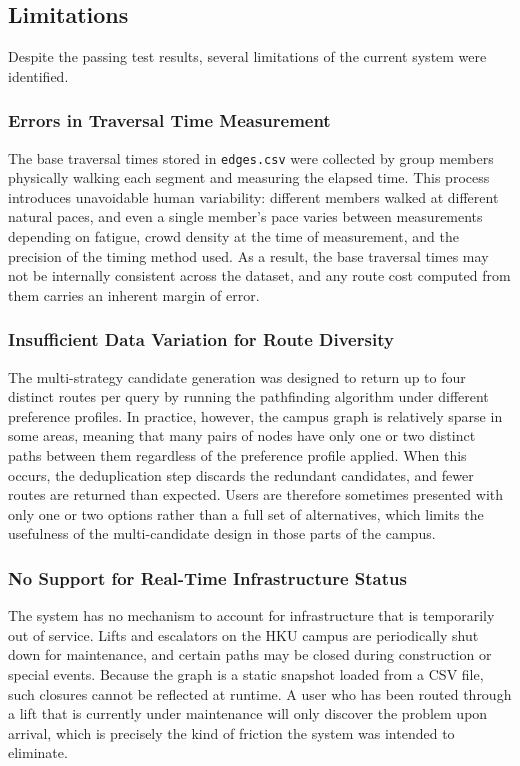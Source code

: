 \documentclass[a4paper,10pt]{amsart}
\begin{document}
\subsection{Limitations}

Despite the passing test results, several limitations of the current system were identified.

\subsubsection{Errors in Traversal Time Measurement}

The base traversal times stored in \texttt{edges.csv} were collected by group members physically walking each segment and measuring the elapsed time.
This process introduces unavoidable human variability: different members walked at different natural paces, and even a single member's pace varies between measurements depending on fatigue, crowd density at the time of measurement, and the precision of the timing method used.
As a result, the base traversal times may not be internally consistent across the dataset, and any route cost computed from them carries an inherent margin of error.

\subsubsection{Insufficient Data Variation for Route Diversity}

The multi-strategy candidate generation was designed to return up to four distinct routes per query by running the pathfinding algorithm under different preference profiles.
In practice, however, the campus graph is relatively sparse in some areas, meaning that many pairs of nodes have only one or two distinct paths between them regardless of the preference profile applied.
When this occurs, the deduplication step discards the redundant candidates, and fewer routes are returned than expected.
Users are therefore sometimes presented with only one or two options rather than a full set of alternatives, which limits the usefulness of the multi-candidate design in those parts of the campus.

\subsubsection{No Support for Real-Time Infrastructure Status}

The system has no mechanism to account for infrastructure that is temporarily out of service.
Lifts and escalators on the HKU campus are periodically shut down for maintenance, and certain paths may be closed during construction or special events.
Because the graph is a static snapshot loaded from a CSV file, such closures cannot be reflected at runtime.
A user who has been routed through a lift that is currently under maintenance will only discover the problem upon arrival, which is precisely the kind of friction the system was intended to eliminate.
\end{document}
